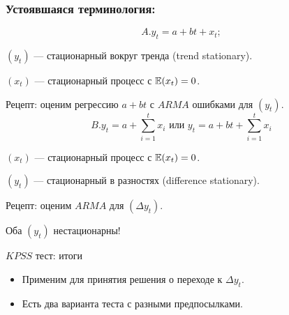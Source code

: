   \begin{frame}
    \frametitle{Устоявшаяся терминология:}
    \[
      A. y_t = a + bt + x_t;
    \]

    $(y_t)$ — \alert{стационарный вокруг тренда} (trend stationary).

    $(x_t)$ — стационарный процесс с $\mathbb{E}(x_t) = 0$.

    \pause Рецепт: оценим регрессию $a + bt$ с $ARMA$ ошибками для $(y_t)$.
    \pause 
    \[
      B. y_t = a + \sum_{i=1}^t x_i \text{ или } y_t = a + bt + \sum_{i=1}^t x_i
    \]

    $(x_t)$ — стационарный процесс с $\mathbb{E}(x_t) = 0$.

    $(y_t)$ — \alert{стационарный в разностях} (difference stationary).

    \pause Рецепт: оценим $ARMA$ для $(\Delta y_t)$.

    \pause Оба $(y_t)$ нестационарны!
    
  \end{frame}


  
  \begin{frame}{$KPSS$ тест: итоги}
  
    \begin{itemize}[<+->]
      \item Применим для принятия решения о переходе к $\Delta y_t$.
      \item Есть два варианта теста с разными предпосылками.
    \end{itemize}
  \end{frame}
  
  
  
  